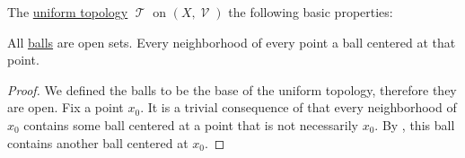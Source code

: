 \begin{proposition}\label{thm:def:uniform_topology}
  The \hyperref[def:uniform_topology]{uniform topology} \( \mscrT \) on \( (X, \mscrV) \) the following basic properties:
  \begin{thmenum}
     All \hyperref[def:entourage/ball]{balls} are open sets.
     Every neighborhood of every point a ball centered at that point.
  \end{thmenum}
\end{proposition}
\begin{proof}
   We defined the balls to be the base of the uniform topology, therefore they are open.
   Fix a point \( x_0 \). It is a trivial consequence of  that every neighborhood of \( x_0 \) contains some ball centered at a point that is not necessarily \( x_0 \). By , this ball contains another ball centered at \( x_0 \).
\end{proof}

